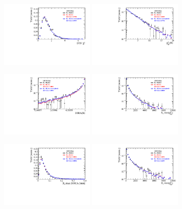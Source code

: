 \begin{figure}[h]
\centering
\includegraphics[height=!,width=0.4\textwidth]{figs/dataVsMC/norm2signal/Ds2all_DTF_CHI2NDOF.pdf}
\includegraphics[height=!,width=0.4\textwidth]{figs/dataVsMC/norm2signal/Ds2all_Bs_IPCHI2_OWNPV.pdf}

\includegraphics[height=!,width=0.4\textwidth]{figs/dataVsMC/norm2signal/Ds2all_Bs_DIRA_OWNPV.pdf}
\includegraphics[height=!,width=0.4\textwidth]{figs/dataVsMC/norm2signal/Ds2all_XsDaughters_min_IPCHI2.pdf}

\includegraphics[height=!,width=0.4\textwidth]{figs/dataVsMC/norm2signal/Ds2all_Xs_max_DOCA.pdf}
\includegraphics[height=!,width=0.4\textwidth]{figs/dataVsMC/norm2signal/Ds2all_DsDaughters_min_IPCHI2.pdf}


\end{figure}
